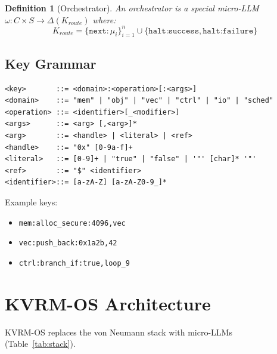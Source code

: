 \documentclass[11pt,a4paper]{article}
\newtheorem{definition}{Definition}[section]
\begin{document}
\begin{definition}[Orchestrator]
An orchestrator is a special micro-LLM $\omega : C \times S \to \Delta(K_{route})$ where:
$$K_{route} = \{ \texttt{next}:\mu_i \}^n_{i=1} \cup \{ \texttt{halt:success}, \texttt{halt:failure} \}$$
\end{definition}

\subsection{Key Grammar}

\begin{lstlisting}[caption={KVRM Key Grammar (EBNF)},label={lst:grammar}]
<key>       ::= <domain>:<operation>[:<args>]
<domain>    ::= "mem" | "obj" | "vec" | "ctrl" | "io" | "sched"
<operation> ::= <identifier>[_<modifier>]
<args>      ::= <arg> [,<arg>]*
<arg>       ::= <handle> | <literal> | <ref>
<handle>    ::= "0x" [0-9a-f]+
<literal>   ::= [0-9]+ | "true" | "false" | '"' [char]* '"'
<ref>       ::= "$" <identifier>
<identifier>::= [a-zA-Z] [a-zA-Z0-9_]*
\end{lstlisting}

\noindent Example keys:
\begin{itemize}
    \item \texttt{mem:alloc\_secure:4096,vec}
    \item \texttt{vec:push\_back:0x1a2b,42}
    \item \texttt{ctrl:branch\_if:true,loop\_9}
\end{itemize}

\section{KVRM-OS Architecture}
\label{sec:architecture}

KVRM-OS replaces the von Neumann stack with micro-LLMs (Table~\ref{tab:stack}).
\end{document}
